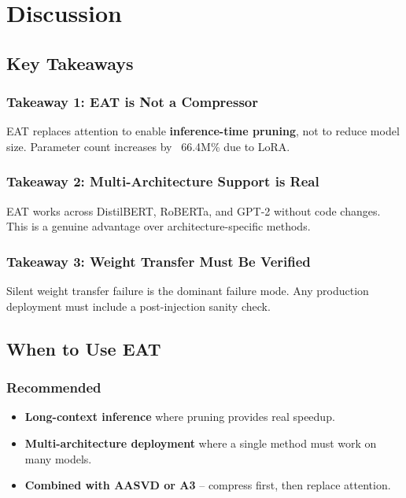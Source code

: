 
\section{Discussion}

\subsection{Key Takeaways}

\subsubsection{Takeaway 1: EAT is Not a Compressor}

EAT replaces attention to enable \textbf{inference-time pruning}, not to reduce 
model size. Parameter count increases by ~66.4M\% due to LoRA.

\subsubsection{Takeaway 2: Multi-Architecture Support is Real}

EAT works across DistilBERT, RoBERTa, and GPT-2 without code changes. This 
is a genuine advantage over architecture-specific methods.

\subsubsection{Takeaway 3: Weight Transfer Must Be Verified}

Silent weight transfer failure is the dominant failure mode. Any production 
deployment must include a post-injection sanity check.

\subsection{When to Use EAT}

\subsubsection{Recommended}

\begin{itemize}
\item \textbf{Long-context inference} where pruning provides real speedup.
\item \textbf{Multi-architecture deployment} where a single method must work on
  many models.
\item \textbf{Combined with AASVD or A3} -- compress first, then replace attention.

\end{itemize}
